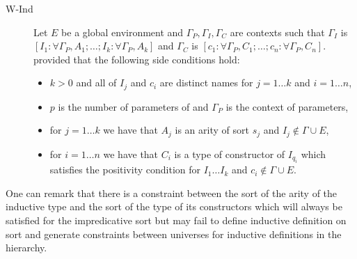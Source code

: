 \begin{description}
\item[W-Ind] Let $E$ be a global environment and
  $\Gamma_P,\Gamma_I,\Gamma_C$ are contexts such that
  $\Gamma_I$ is $[I_1:\forall \Gamma_P,A_1;\ldots;I_k:\forall
  \Gamma_P,A_k]$ and $\Gamma_C$ is 
  $[c_1:\forall \Gamma_P,C_1;\ldots;c_n:\forall \Gamma_P,C_n]$. 
provided that the following side conditions hold:
\begin{itemize}
\item $k>0$ and all of $I_j$ and $c_i$ are distinct names for $j=1\ldots  k$ and $i=1\ldots  n$,
\item $p$ is the number of parameters of 
  and $\Gamma_P$ is the context of parameters, 
\item for $j=1\ldots  k$ we have that $A_j$ is an arity of sort $s_j$ and $I_j
  \notin \Gamma \cup E$,
\item for $i=1\ldots  n$ we have that $C_i$ is a type of constructor of
  $I_{q_i}$ which satisfies the positivity condition for $I_1 \ldots  I_k$
  and $c_i \notin \Gamma \cup E$.
\end{itemize}
\end{description}
One can remark that there is a constraint between the sort of the
arity of the inductive type and the sort of the type of its
constructors which will always be satisfied for the impredicative sort
{\Prop} but may fail to define inductive definition 
on sort \Set{} and generate constraints between universes for
inductive definitions in the {\Type} hierarchy.

